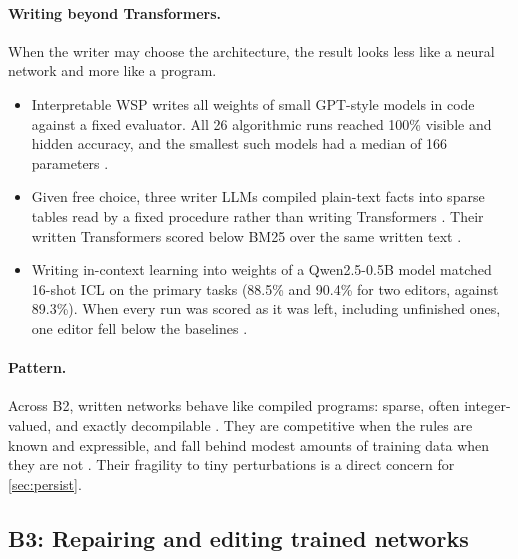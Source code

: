 \paragraph{Writing beyond Transformers.} When the writer may choose the architecture, the result looks less like a neural network and more like a program.
\begin{itemize}[leftmargin=*,itemsep=2pt]
\item Interpretable WSP writes all weights of small GPT-style models in code against a fixed evaluator. All 26 algorithmic runs reached 100\% visible and hidden accuracy, and the smallest such models had a median of 166 parameters \citep{ax2611_18114}.
\item Given free choice, three writer LLMs compiled plain-text facts into sparse tables read by a fixed procedure rather than writing Transformers \citep{ax2611_22055}. Their written Transformers scored below BM25 over the same written text \citep{ax2611_22055}.
\item Writing in-context learning into weights of a Qwen2.5-0.5B model matched 16-shot ICL on the primary tasks (88.5\% and 90.4\% for two editors, against 89.3\%). When every run was scored as it was left, including unfinished ones, one editor fell below the baselines \citep{ax2611_26841}.
\end{itemize}

\paragraph{Pattern.} Across B2, written networks behave like compiled programs: sparse, often integer-valued, and exactly decompilable \citep{ax2611_21449,ax2611_16981}. They are competitive when the rules are known and expressible, and fall behind modest amounts of training data when they are not \citep{ax2611_12066,ax2611_22013}. Their fragility to tiny perturbations \citep{ax2611_16981} is a direct concern for \cref{sec:persist}.

\subsection{B3: Repairing and editing trained networks}
\label{sec:repair}

